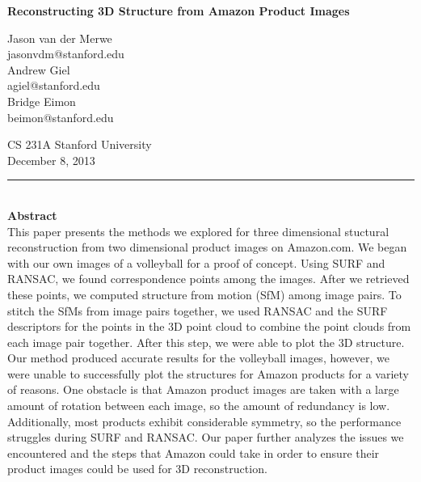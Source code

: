 \documentclass[12pt]{article}
\begin{document}
\begin{center}

{\Large \textbf{Reconstructing 3D Structure from Amazon Product Images}}

\begin{multicols}{3}
Jason van der Merwe\\
jasonvdm@stanford.edu\\
\columnbreak
Andrew Giel\\
agiel@stanford.edu\\
\columnbreak
Bridge Eimon\\
beimon@stanford.edu\\
\end{multicols}
CS 231A Stanford University\\
December 8, 2013\\
\end{center}
\noindent\rule{16.5cm}{0.4pt}\\
{\large \textbf{Abstract}}\\
This paper presents the methods we explored for three dimensional stuctural reconstruction from two dimensional product images on Amazon.com. We began with our own images of a volleyball for a proof of concept. Using SURF and RANSAC, we found correspondence points among the images. After we retrieved these points, we computed structure from motion (SfM) among image pairs. To stitch the SfMs from image pairs together, we used RANSAC and the SURF descriptors for the points in the 3D point cloud to combine the point clouds from each image pair together. After this step, we were able to plot the 3D structure. Our method produced accurate results for the volleyball images, however, we were unable to successfully plot the structures for Amazon products for a variety of reasons. One obstacle is that Amazon product images are taken with a large amount of rotation between each image, so the amount of redundancy is low. Additionally, most products exhibit considerable symmetry, so the performance struggles during SURF and RANSAC. Our paper further analyzes the issues we encountered and the steps that Amazon could take in order to ensure their product images could be used for 3D reconstruction.\\
\end{document}
